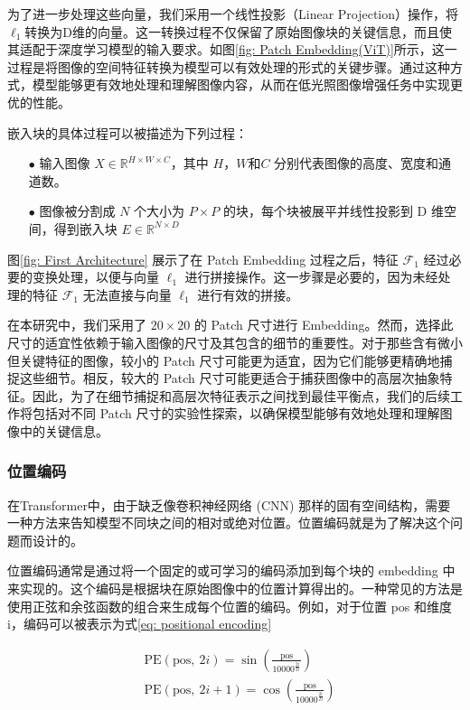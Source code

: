 \documentclass[a4paper]{ctexart}
\begin{document}
为了进一步处理这些向量，我们采用一个线性投影（Linear Projection）操作，将$\ell_1$转换为D维的向量。这一转换过程不仅保留了原始图像块的关键信息，而且使其适配于深度学习模型的输入要求。如图\ref{fig: Patch Embedding(ViT)}所示，这一过程是将图像的空间特征转换为模型可以有效处理的形式的关键步骤。通过这种方式，模型能够更有效地处理和理解图像内容，从而在低光照图像增强任务中实现更优的性能。
	
嵌入块的具体过程可以被描述为下列过程：
	
\begin{itemize}
	\item[$\bullet$] 
	输入图像 $X \in \mathbb{R}^{H \times W \times C}$，其中 $H$，$W$和$C$ 分别代表图像的高度、宽度和通道数。
	\item[$\bullet$]
	图像被分割成 $N$ 个大小为 $P \times P$ 的块，每个块被展平并线性投影到 D 维空间，得到嵌入块 $E \in \mathbb{R}^{N \times D}$
\end{itemize}

图\ref{fig: First Architecture} 展示了在 Patch Embedding 过程之后，特征 $\mathcal{F}_1$ 经过必要的变换处理，以便与向量 $\ell_1$ 进行拼接操作。这一步骤是必要的，因为未经处理的特征 $\mathcal{F}_1$ 无法直接与向量 $\ell_1$ 进行有效的拼接。

在本研究中，我们采用了 $20 \times 20$ 的 Patch 尺寸进行 Embedding。然而，选择此尺寸的适宜性依赖于输入图像的尺寸及其包含的细节的重要性。对于那些含有微小但关键特征的图像，较小的 Patch 尺寸可能更为适宜，因为它们能够更精确地捕捉这些细节。相反，较大的 Patch 尺寸可能更适合于捕获图像中的高层次抽象特征。因此，为了在细节捕捉和高层次特征表示之间找到最佳平衡点，我们的后续工作将包括对不同 Patch 尺寸的实验性探索，以确保模型能够有效地处理和理解图像中的关键信息。
	
\subsubsection{位置编码}
	
在Transformer中，由于缺乏像卷积神经网络 (CNN) 那样的固有空间结构，需要一种方法来告知模型不同块之间的相对或绝对位置。位置编码就是为了解决这个问题而设计的。
	
位置编码通常是通过将一个固定的或可学习的编码添加到每个块的 embedding 中来实现的。这个编码是根据块在原始图像中的位置计算得出的。一种常见的方法是使用正弦和余弦函数的组合来生成每个位置的编码。例如，对于位置 pos 和维度 i，编码可以被表示为式\ref{eq: positional encoding}
	
\begin{equation}
	\begin{aligned}
		&\text{PE}(\text{pos}, \ 2i) = \sin \left(\frac{\text{pos}}{10000^{\frac{2i}{D}}}\right) \\
		&\text{PE}(\text{pos}, \ 2i + 1) = \cos \left(\frac{\text{pos}}{10000^{\frac{2i}{D}}}\right)
	\end{aligned}
	\label{eq: positional encoding}
\end{equation}
	
\end{document}
